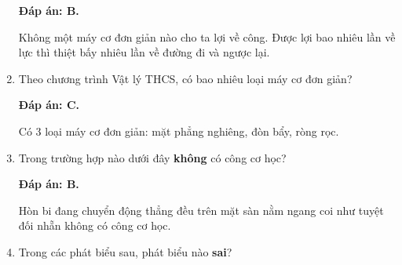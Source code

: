 \begin{enumerate}[label=\bfseries Câu \arabic*:]
	\hideall
	{\textbf{Đáp án: B.}
		
		Không một máy cơ đơn giản nào cho ta lợi về công. Được lợi bao nhiêu lần về lực thì thiệt bấy nhiêu lần về đường đi và ngược lại.
		
	}
	\item {}
	
	
	{Theo chương trình Vật lý THCS, có bao nhiêu loại máy cơ đơn giản?
	}
	
	\hideall
	{\textbf{Đáp án: C.}
		
		Có 3 loại máy cơ đơn giản: mặt phẳng nghiêng, đòn bẩy, ròng rọc.
		
		
	}
	\item {}
	
	
	{
		Trong trường hợp nào dưới đây \textbf{không} có công cơ học?
	}
	
	\hideall
	{\textbf{Đáp án: B.}
		
		Hòn bi đang chuyển động thẳng đều trên mặt sàn nằm ngang coi như tuyệt đối nhẵn không có công cơ học.
		
	}
	
	\item {}
	
	
	{Trong các phát biểu sau, phát biểu nào \textbf{sai}?
		
}
\end{enumerate}
